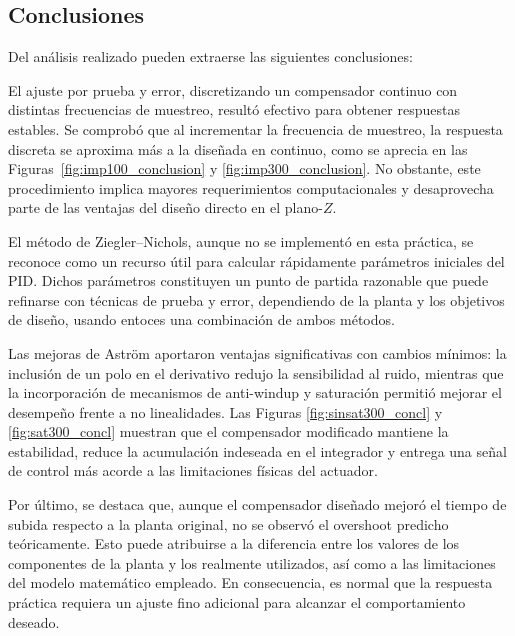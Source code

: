 \subsection{Conclusiones}

Del análisis realizado pueden extraerse las siguientes conclusiones:

El ajuste por prueba y error, discretizando un compensador continuo con distintas frecuencias de muestreo, resultó efectivo para obtener respuestas estables. Se comprobó que al incrementar la frecuencia de muestreo, la respuesta discreta se aproxima más a la diseñada en continuo, como se aprecia en las Figuras~\ref{fig:imp100_conclusion} y \ref{fig:imp300_conclusion}. No obstante, este procedimiento implica mayores requerimientos computacionales y desaprovecha parte de las ventajas del diseño directo en el plano-$Z$.

El método de Ziegler--Nichols, aunque no se implementó en esta práctica, se reconoce como un recurso útil para calcular rápidamente parámetros iniciales del PID. Dichos parámetros constituyen un punto de partida razonable que puede refinarse con técnicas de prueba y error, dependiendo de la planta y los objetivos de diseño, usando entoces una combinación de ambos métodos.

Las mejoras de Astr\"om aportaron ventajas significativas con cambios mínimos: la inclusión de un polo en el derivativo redujo la sensibilidad al ruido, mientras que la incorporación de mecanismos de anti-windup y saturación permitió mejorar el desempeño frente a no linealidades. Las Figuras \ref{fig:sinsat300_concl} y \ref{fig:sat300_concl} muestran que el compensador modificado mantiene la estabilidad, reduce la acumulación indeseada en el integrador y entrega una señal de control más acorde a las limitaciones físicas del actuador.

Por último, se destaca que, aunque el compensador diseñado mejoró el tiempo de subida respecto a la planta original, no se observó el overshoot predicho teóricamente. Esto puede atribuirse a la diferencia entre los valores de los componentes de la planta y los realmente utilizados, así como a las limitaciones del modelo matemático empleado. En consecuencia, es normal que la respuesta práctica requiera un ajuste fino adicional para alcanzar el comportamiento deseado.
